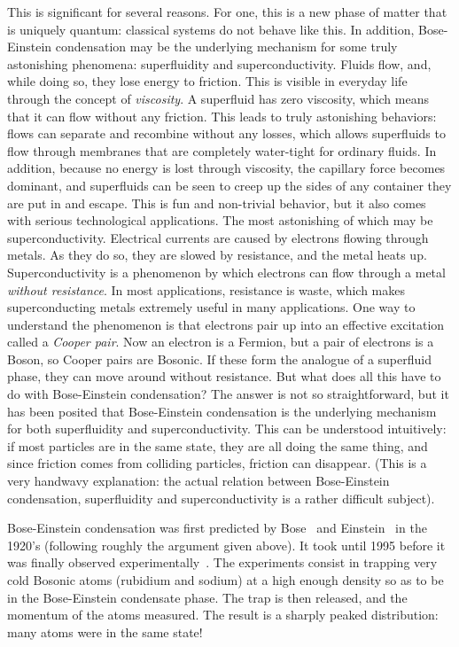 \documentclass{ian}
\begin{document}
\indent
This is significant for several reasons.
For one, this is a new phase of matter that is uniquely quantum: classical systems do not behave like this.
In addition, Bose-Einstein condensation may be the underlying mechanism for some truly astonishing phenomena: superfluidity and superconductivity.
Fluids flow, and, while doing so, they lose energy to friction.
This is visible in everyday life through the concept of {\it viscosity}.
A superfluid has zero viscosity, which means that it can flow without any friction.
This leads to truly astonishing behaviors: flows can separate and recombine without any losses, which allows superfluids to flow through membranes that are completely water-tight for ordinary fluids.
In addition, because no energy is lost through viscosity, the capillary force becomes dominant, and superfluids can be seen to creep up the sides of any container they are put in and escape.
This is fun and non-trivial behavior, but it also comes with serious technological applications.
The most astonishing of which may be superconductivity.
Electrical currents are caused by electrons flowing through metals.
As they do so, they are slowed by resistance, and the metal heats up.
Superconductivity is a phenomenon by which electrons can flow through a metal {\it without resistance}.
In most applications, resistance is waste, which makes superconducting metals extremely useful in many applications.
One way to understand the phenomenon is that electrons pair up into an effective excitation called a {\it Cooper pair}.
Now an electron is a Fermion, but a pair of electrons is a Boson, so Cooper pairs are Bosonic.
If these form the analogue of a superfluid phase, they can move around without resistance.
But what does all this have to do with Bose-Einstein condensation?
The answer is not so straightforward, but it has been posited that Bose-Einstein condensation is the underlying mechanism for both superfluidity and superconductivity.
This can be understood intuitively: if most particles are in the same state, they are all doing the same thing, and since friction comes from colliding particles, friction can disappear.
(This is a very handwavy explanation: the actual relation between Bose-Einstein condensation, superfluidity and superconductivity is a rather difficult subject).
\bigskip

\indent
Bose-Einstein condensation was first predicted by Bose\-~\cite{Bo24} and Einstein\-~\cite{Ei24} in the 1920's (following roughly the argument given above).
It took until 1995 before it was finally observed experimentally\-~\cite{AEe95,DMe95}.
The experiments consist in trapping very cold Bosonic atoms (rubidium and sodium) at a high enough density so as to be in the Bose-Einstein condensate phase.
The trap is then released, and the momentum of the atoms measured.
The result is a sharply peaked distribution: many atoms were in the same state!
\end{document}
